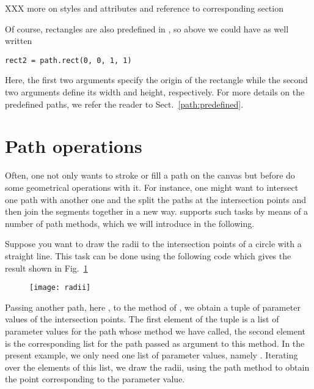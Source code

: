 XXX more on styles and attributes and reference to corresponding section

Of course, rectangles are also predefined in \PyX{}, so above we could
have as well written
\begin{verbatim}
rect2 = path.rect(0, 0, 1, 1)
\end{verbatim}
Here, the first two arguments specify the origin of the rectangle
while the second two arguments define its width and height,
respectively. For more details on the predefined paths, we
refer the reader to Sect.~\ref{path:predefined}.

\section{Path operations}

Often, one not only wants to stroke or fill a path on the canvas
but before do some geometrical operations with it. For instance, one
might want to intersect one path with another one and the split the
paths at the intersection points and then join the segments together
in a new way. \PyX{} supports such tasks by means of a number
of path methods, which we will introduce in the following.

Suppose you want to draw the radii to the intersection points of a
circle with a straight line. This task can be done using the following
code which gives the result shown in Fig.~\ref{fig:radii}

\begin{figure}
\centerline{\texttt{[image: radii]}}
\label{fig:radii}
\end{figure}
Passing another path, here , to the  method
of , we obtain a tuple of parameter values of the
intersection points. The first element of the tuple is a list of
parameter values for the path whose  method we have
called, the second element is the corresponding list for the path
passed as argument to this method. In the present example, we only
need one list of parameter values, namely .
Iterating over the elements of this list, we draw the radii, using the
 path method to obtain the point corresponding to the
parameter value.

